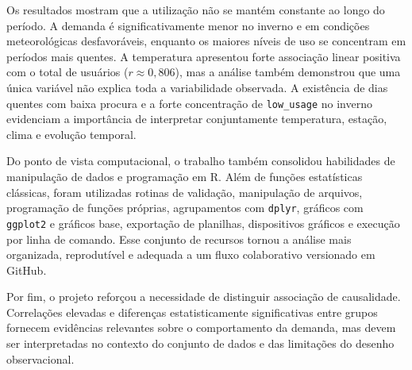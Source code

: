 \documentclass[12pt,oneside,a4paper,english,brazil]{abntex2}
\begin{document}
Os resultados mostram que a utilização não se mantém constante ao longo do período. A demanda é significativamente menor no inverno e em condições meteorológicas desfavoráveis, enquanto os maiores níveis de uso se concentram em períodos mais quentes. A temperatura apresentou forte associação linear positiva com o total de usuários ($r\approx0{,}806$), mas a análise também demonstrou que uma única variável não explica toda a variabilidade observada. A existência de dias quentes com baixa procura e a forte concentração de \texttt{low\_usage} no inverno evidenciam a importância de interpretar conjuntamente temperatura, estação, clima e evolução temporal.

Do ponto de vista computacional, o trabalho também consolidou habilidades de manipulação de dados e programação em R. Além de funções estatísticas clássicas, foram utilizadas rotinas de validação, manipulação de arquivos, programação de funções próprias, agrupamentos com \texttt{dplyr}, gráficos com \texttt{ggplot2} e gráficos base, exportação de planilhas, dispositivos gráficos e execução por linha de comando. Esse conjunto de recursos tornou a análise mais organizada, reprodutível e adequada a um fluxo colaborativo versionado em GitHub.

Por fim, o projeto reforçou a necessidade de distinguir associação de causalidade. Correlações elevadas e diferenças estatisticamente significativas entre grupos fornecem evidências relevantes sobre o comportamento da demanda, mas devem ser interpretadas no contexto do conjunto de dados e das limitações do desenho observacional.


\postextual
\end{document}
